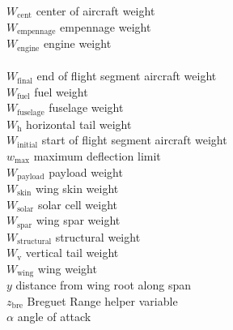 \begin{multicols}{2}
\begin{tabbing}
$W_{\text{cent}}$ \> center of aircraft weight \\ %
$W_{\text{empennage}}$ \> empennage weight \\ %
$W_{\text{engine}}$ \> engine weight \\ %
\DIFaddbegin {}\\ %
\DIFaddend $W_{\text{final}}$ \> end of flight segment aircraft weight \\ %
$W_{\text{fuel}}$ \> fuel weight \\ %
$W_{\text{fuselage}}$ \> fuselage weight \\ %
$W_{\text{h}}$ \> horizontal tail weight \\ %
$W_{\text{initial}}$ \> start of flight segment aircraft weight \\ %
$w_{\text{max}}$ \> maximum deflection limit \\ %
$W_{\text{payload}}$ \> payload weight \\ %
$W_{\text{skin}}$ \> wing skin weight \\ %
$W_{\text{solar}}$ \> solar cell weight \\ %
$W_{\text{spar}}$ \> wing spar weight \\ %
$W_{\text{structural}}$ \> structural weight \\ %
$W_{\text{v}}$ \> vertical tail weight \\ %
$W_{\text{wing}}$ \> wing weight \\ %
$y$ \> distance from wing root along span \\ %
$z_{\text{bre}}$ \> Breguet Range helper variable \\
$\alpha$ \> angle of attack \\

\end{tabbing}
\end{multicols}
